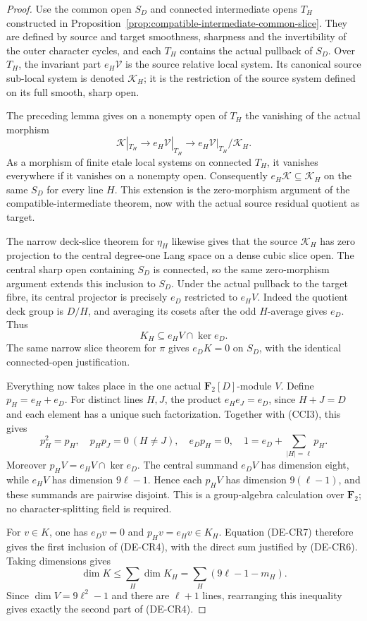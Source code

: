 \begin{proof}
Use the common open \(S_D\) and connected intermediate opens
\(T_H\) constructed in
Proposition~\ref{prop:compatible-intermediate-common-slice}.
They are defined by source and target smoothness, sharpness and
the invertibility of the outer character cycles, and each \(T_H\)
contains the actual pullback of \(S_D\).
Over \(T_H\), the invariant part \(e_H\mathcal V\) is the
source relative local system. Its canonical source sub-local
system is denoted \(\mathcal K_H\); it is the restriction of
the source system defined on its full smooth, sharp open.

The preceding lemma gives on a nonempty open of \(T_H\) the
vanishing of the actual morphism
\[
 \mathcal K|_{T_H}\longrightarrow e_H\mathcal V|_{T_H}
           \longrightarrow e_H\mathcal V|_{T_H}/\mathcal K_H.
 \tag{DE-CR5}
\]
As a morphism of finite etale local systems on connected \(T_H\),
it vanishes everywhere if it vanishes on a nonempty open.
Consequently \(e_H\mathcal K\subseteq\mathcal K_H\) on
the same \(S_D\) for every line \(H\). This extension is the
zero-morphism argument of the compatible-intermediate theorem,
now with the actual source residual quotient as target.

The narrow deck-slice theorem for \(\eta_H\) likewise gives
that the source \(\mathcal K_H\) has zero projection to the
central degree-one Lang space on a dense cubic slice open.
The central sharp open containing \(S_D\) is connected, so
the same zero-morphism argument extends this inclusion to
\(S_D\). Under the actual pullback to the target fibre, its
central projector is precisely \(e_D\) restricted to
\(e_HV\). Indeed the quotient deck group is \(D/H\), and
averaging its cosets after the odd \(H\)-average gives
\(e_D\). Thus
\[
           K_H\subseteq e_HV\cap\ker e_D.
 \tag{DE-CR6}
\]
The same narrow slice theorem for \(\pi\) gives \(e_DK=0\)
on \(S_D\), with the identical connected-open justification.

Everything now takes place in the one actual
\(\mathbf F_2[D]\)-module \(V\). Define
\(p_H=e_H+e_D\). For distinct lines \(H,J\), the product
\(e_He_J=e_D\), since \(H+J=D\) and each element has a
unique such factorization. Together with (CCI3), this gives
\[
 p_H^2=p_H,\quad p_Hp_J=0\ (H\ne J),\quad
 e_Dp_H=0,\quad 1=e_D+\sum_{|H|=\ell}p_H.
 \tag{DE-CR7}
\]
Moreover \(p_HV=e_HV\cap\ker e_D\). The central summand
\(e_DV\) has dimension eight, while \(e_HV\) has dimension
\(9\ell-1\). Hence each \(p_HV\) has dimension
\(9(\ell-1)\), and these summands are pairwise disjoint.
This is a group-algebra calculation over \(\mathbf F_2\);
no character-splitting field is required.

For \(v\in K\), one has \(e_Dv=0\) and
\(p_Hv=e_Hv\in K_H\). Equation (DE-CR7) therefore gives
the first inclusion of (DE-CR4), with the direct sum justified
by (DE-CR6). Taking dimensions gives
\[
 \dim K\le\sum_H\dim K_H
           =\sum_H(9\ell-1-m_H).
\]
Since \(\dim V=9\ell^2-1\) and there are \(\ell+1\)
lines, rearranging this inequality gives exactly the second
part of (DE-CR4).
\end{proof}

